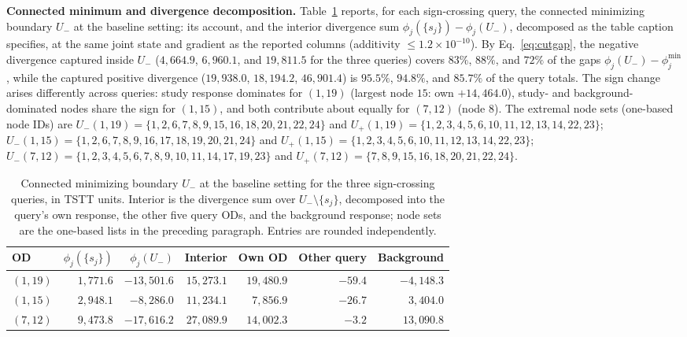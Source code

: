 \textbf{Connected minimum and divergence decomposition.}
Table~\ref{tab:negmech} reports, for each sign-crossing query, the
connected minimizing boundary $U_-$ at the baseline setting: its
account, and the interior divergence sum
$\phi_j(\{s_j\})-\phi_j(U_-)$, decomposed as the table caption
specifies, at the same joint state and gradient as the reported
columns (additivity $\le1.2\times10^{-10}$).
By Eq.~\eqref{eq:cutgap}, the negative divergence captured inside
$U_-$ ($4{,}664.9$, $6{,}960.1$, and $19{,}811.5$ for the three
queries) covers $83\%$, $88\%$, and $72\%$ of the gaps
$\phi_j(U_-)-\phi_j^{\min}$, while the captured positive divergence
($19{,}938.0$, $18{,}194.2$, $46{,}901.4$) is $95.5\%$, $94.8\%$,
and $85.7\%$ of the query totals. The sign change arises
differently across queries: study response
dominates for $(1,19)$ (largest node $15$: own $+14{,}464.0$),
study- and background-dominated nodes share the sign for $(1,15)$,
and both contribute about equally for $(7,12)$ (node $8$).
The extremal node sets (one-based node IDs) are
$U_-(1,19)=\{1,2,6,7,8,9,15,16,18,20,21,22,24\}$ and
$U_+(1,19)=\{1,2,3,4,5,6,10,11,12,13,14,22,23\}$;
$U_-(1,15)=\{1,2,6,7,8,9,16,17,18,19,20,21,24\}$ and
$U_+(1,15)=\{1,2,3,4,5,6,10,11,12,13,14,22,23\}$;
$U_-(7,12)=\{1,2,3,4,5,6,7,8,9,10,11,14,17,19,23\}$ and
$U_+(7,12)=\{7,8,9,15,16,18,20,21,22,24\}$.

\begin{table}[pos=tbh]
\caption{Connected minimizing boundary $U_-$ at the baseline setting
for the three sign-crossing queries, in TSTT units. Interior is the
divergence sum over $U_-\setminus\{s_j\}$, decomposed into the query's
own response, the other five query ODs, and the background response;
node sets are the one-based lists in the preceding paragraph. Entries
are rounded independently.}
\label{tab:negmech}
\small
\begin{tabular*}{\tblwidth}{@{\extracolsep{\fill}}lrrrrrr}
\toprule
OD & $\phi_j(\{s_j\})$ & $\phi_j(U_-)$ & Interior & Own OD & Other query & Background\\
\midrule
$(1,19)$ & $1{,}771.6$ & $-13{,}501.6$ & $15{,}273.1$ & $19{,}480.9$ & $-59.4$ & $-4{,}148.3$ \\
$(1,15)$ & $2{,}948.1$ & $-8{,}286.0$ & $11{,}234.1$ & $7{,}856.9$ & $-26.7$ & $3{,}404.0$ \\
$(7,12)$ & $9{,}473.8$ & $-17{,}616.2$ & $27{,}089.9$ & $14{,}002.3$ & $-3.2$ & $13{,}090.8$ \\
\bottomrule
\end{tabular*}
\end{table}


